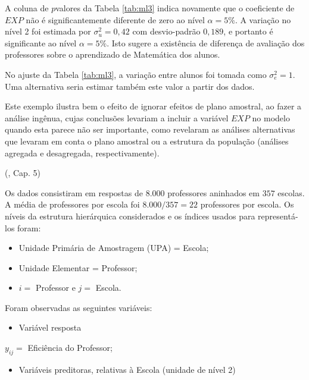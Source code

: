 \documentclass[]{book}
\providecommand{\tightlist}{%
  \setlength{\itemsep}{0pt}\setlength{\parskip}{0pt}}
\theoremstyle{definition}
\theoremstyle{definition}
\theoremstyle{definition}
\theoremstyle{remark}
\let\BeginKnitrBlock\begin \let\EndKnitrBlock\end
\begin{document}
A coluna de \(p\)valores da Tabela \ref{tab:ml3} indica novamente que o
coeficiente de \(EXP\) não é significantemente diferente de zero ao
nível \(\alpha =5\%\). A variação no nível 2 foi estimada por
\(\sigma_{u}^{2}=0,42\) com desvio-padrão \(0,189\), e portanto é
significante ao nível \(\alpha =5\%\). Isto sugere a existência de
diferença de avaliação dos professores sobre o aprendizado de Matemática
dos alunos.

No ajuste da Tabela \ref{tab:ml3}, a variação entre alunos foi tomada
como \(\sigma _{e}^{2}=1.\) Uma alternativa seria estimar também este
valor a partir dos dados.

Este exemplo ilustra bem o efeito de ignorar efeitos de plano amostral,
ao fazer a análise ingênua, cujas conclusões levariam a incluir a
variável \(EXP\) no modelo quando esta parece não ser importante, como
revelaram as análises alternativas que levaram em conta o plano amostral
ou a estrutura da população (análises agregada e desagregada,
respectivamente).\pagebreak 

\BeginKnitrBlock{example}
\protect\hypertarget{exm:exe132}{}{\label{exm:exe132} }(\citep{bryk}, Cap.
5)
\EndKnitrBlock{example}

Os dados consistiram em respostas de \(8.000\) professores aninhados em
\(357\) escolas. A média de professores por escola foi \(8.000/357=22\)
professores por escola. Os níveis da estrutura hierárquica considerados
e os índices usados para representá-los foram:

\begin{itemize}
\item
  Unidade Primária de Amostragem (UPA) = Escola;
\item
  Unidade Elementar = Professor;
\item
  \(i=\) Professor e \(j=\) Escola.
\end{itemize}

Foram observadas as seguintes variáveis:

\begin{itemize}
\tightlist
\item
  Variável resposta
\end{itemize}

\(y_{ij}=\) Eficiência do Professor;

\begin{itemize}
\tightlist
\item
  Variáveis preditoras, relativas à Escola (unidade de nível 2)
\end{itemize}
\end{document}
